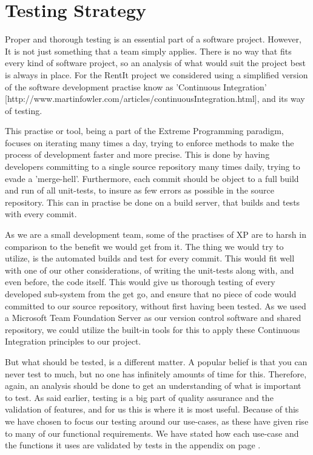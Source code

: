 \section{Testing Strategy} \label{TestingStrategy}
Proper and thorough testing is an essential part of a software project. However, It is not just something that a team simply applies. There is no way that fits every kind of software project, so an analysis of what would suit the project best is always in place. For the RentIt project we considered using a simplified version of the software development practise know as 'Continuous Integration' [http://www.martinfowler.com/articles/continuousIntegration.html], and its way of testing.

This practise or tool, being a part of the Extreme Programming paradigm, focuses on iterating many times a day, trying to enforce methods to make the process of development faster and more precise. This is done by having developers committing to a single source repository many times daily, trying to evade a 'merge-hell'. Furthermore, each commit should be object to a full build and run of all unit-tests, to insure as few errors as possible in the source repository. This can in practise be done on a build server, that builds and tests with every commit.

As we are a small development team, some of the practises of XP are to harsh in comparison to the benefit we would get from it. The thing we would try to utilize, is the automated builds and test for every commit. This would fit well with one of our other considerations, of writing the unit-tests along with, and even before, the code itself. This would give us thorough testing of every developed sub-system from the get go, and ensure that no piece of code would  committed to our source repository, without first having been tested. As we used a Microsoft Team Foundation Server as our version control software and shared repository, we could utilize the built-in tools for this to apply these Continuous Integration principles to our project.


But what should be tested, is a different matter. A popular belief is that you can never test to much, but no one has infinitely amounts of time for this. Therefore, again, an analysis should be done to get an understanding of what is important to test. As said earlier, testing is a big part of quality assurance and the validation of features, and for us this is where it is most useful. Because of this we have chosen to focus our testing around our use-cases, as these have given rise to many of our functional requirements. We have stated how each use-case and the functions it uses are validated by tests in the appendix on page \pageref{TestAppendix}.

